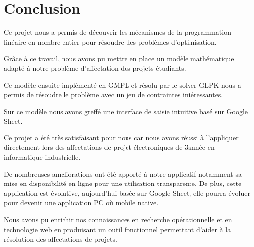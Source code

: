 \documentclass[final,poster]{polytech/polytech}
\begin{document}


\chapter*{Conclusion}

Ce projet nous a permis de découvrir les mécanismes de la programmation linéaire en nombre entier pour résoudre des problèmes d'optimisation. 

Grâce à ce travail, nous avons pu mettre en place un modèle mathématique adapté à notre problème d'affectation des projets étudiants. 

Ce modèle ensuite implémenté en GMPL et résolu par le solver GLPK nous a permis de résoudre le problème avec un jeu de contraintes intéressantes.

Sur ce modèle nous avons greffé une interface de saisie intuitive basé sur Google Sheet.

Ce projet a été très satisfaisant pour nous car nous avons réussi à l'appliquer directement lors des affectations de projet électroniques de 3\ieme année en informatique industrielle.

De nombreuses améliorations ont été apporté à notre applicatif notamment sa mise en disponibilité en ligne pour une utilisation transparente. 
De plus, cette application est évolutive, aujourd'hui basée sur Google Sheet, elle pourra évoluer pour devenir une application PC où mobile native.

Nous avons pu enrichir nos connaissances en recherche opérationnelle et en technologie web en produisant un outil fonctionnel permettant d'aider à la résolution des affectations de projets.

\end{document}
